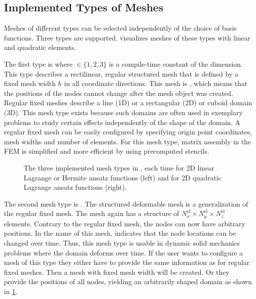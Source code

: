 \subsection{Implemented Types of Meshes}
Meshes of different types can be selected independently of the choice of basis functions. Three types are supported.  visualizes meshes of these types with linear and quadratic elements.

The first type is  where  $\in \{1,2,3\}$ is a compile-time constant of the dimension. This type describes a rectilinear, regular structured mesh that is defined by a fixed mesh width $h$ in all coordinate directions. This mesh is , which means that the positions of the nodes cannot change after the mesh object was created. 
Regular fixed meshes describe a line (1D) or a rectangular (2D) or cuboid domain (3D). This mesh type exists because such domains are often used in exemplary problems to study certain effects independently of the shape of the domain. A regular fixed mesh can be easily configured by specifying origin point coordinates, mesh widths and number of elements. For this mesh type, matrix assembly in the FEM is simplified and more efficient by using precomputed stencils.

\begin{figure}%
  \centering%
  \def\svgwidth{0.5\textwidth}
  \caption{The three implemented mesh types in \opendihu{}, each time for 2D linear Lagrange or Hermite ansatz functions (left) and for 2D quadratic Lagrange ansatz functions (right).}%
  \label{fig:meshe_types}%
\end{figure}%

The second mesh type is . The structured deformable mesh is a generalization of the regular fixed mesh. The mesh again has a structure of $N^\text{el}_x \times N^\text{el}_y \times N^\text{el}_z$ elements. Contrary to the regular fixed mesh, the nodes can now have arbitrary positions. In the name of this mesh,  indicates that the node locations can be changed over time. Thus, this mesh type is usable in dynamic solid mechanics problems where the domain deforms over time. If the user wants to configure a mesh of this type they either have to provide the same information as for regular fixed meshes. Then a mesh with fixed mesh width will be created. Or they provide the positions of all nodes, yielding an arbitrarily shaped domain as shown in \cref{fig:meshe_types}.

